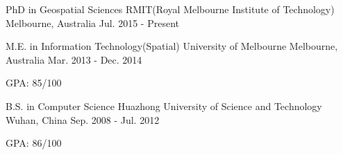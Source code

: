 

\begin{cventries}

\cventry
{PhD in Geospatial Sciences}
{RMIT(Royal Melbourne Institute of Technology)}
{Melbourne, Australia}
{Jul. 2015 - Present}
{}



\cventry
{M.E. in Information Technology(Spatial)}
{University of Melbourne}
{Melbourne, Australia}
{Mar. 2013 - Dec. 2014}
{
\begin{cvitems}
\item {GPA: 85/100}
\end{cvitems}
}



\cventry
{B.S. in Computer Science} %
{Huazhong University of Science and Technology} %
{Wuhan, China} %
{Sep. 2008 - Jul. 2012} %
{ %
\begin{cvitems}
\item {GPA: 86/100}
\end{cvitems}
}


\end{cventries}